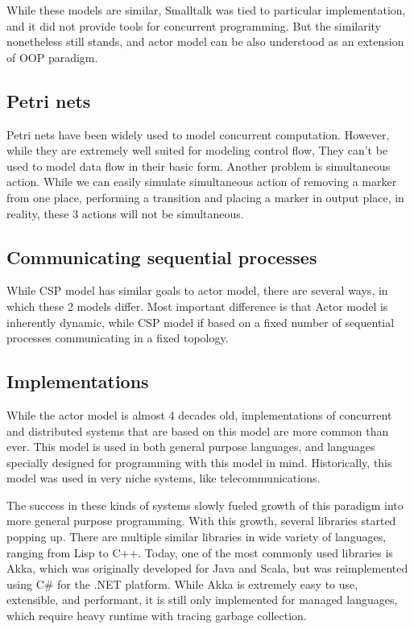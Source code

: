 While these models are similar, Smalltalk was tied to particular implementation, and it did not provide
tools for concurrent programming. But the similarity nonetheless still stands, and actor model can be also understood as
an extension of OOP paradigm.

\subsection{Petri nets}
Petri nets have been widely used to model concurrent computation. However, while they are extremely well suited
for modeling control flow, They can't be used to model data flow in their basic form. Another problem is
simultaneous action. While we can easily simulate simultaneous action of removing a marker from one place, performing
a transition and placing a marker in output place, in reality, these 3 actions will not be simultaneous.

\subsection{Communicating sequential processes}
While CSP model has similar goals to actor model, there are several ways, in which these 2 models differ.
Most important difference is that Actor model is inherently
dynamic, while CSP model if based on a fixed number of sequential processes communicating in a fixed topology\cite{Hoare:1985:CSP:3921}.

\subsection{Implementations}
While the actor model is almost 4 decades old, implementations of concurrent and distributed systems that
are based on this model are more common than ever. This model is used in both general purpose languages, and
languages specially designed for programming with this model in mind. Historically, this model
was used in very niche systems, like telecommunications.

The success in these kinds of systems slowly fueled growth of this paradigm into more general purpose programming. With this
growth, several libraries started popping up. There are multiple similar libraries in
wide variety of languages, ranging from Lisp to C++. Today, one of the most commonly used libraries is Akka\cite{web:akka}, which was originally
developed for Java and Scala, but was reimplemented using C\# for the .NET platform. While Akka is extremely easy to use,
extensible, and performant, it is still only implemented for managed languages, which require heavy runtime with tracing garbage collection.

